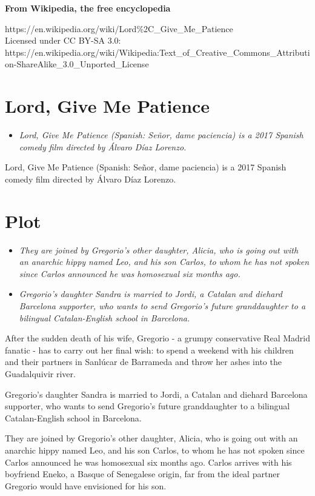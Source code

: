 \textbf{From Wikipedia, the free encyclopedia}

https://en.wikipedia.org/wiki/Lord\%2C\_Give\_Me\_Patience\\
Licensed under CC BY-SA 3.0:\\
https://en.wikipedia.org/wiki/Wikipedia:Text\_of\_Creative\_Commons\_Attribution-ShareAlike\_3.0\_Unported\_License

\section{Lord, Give Me Patience}\label{lord-give-me-patience}

\begin{itemize}
\item
  \emph{Lord, Give Me Patience (Spanish: Señor, dame paciencia) is a
  2017 Spanish comedy film directed by Álvaro Díaz Lorenzo.}
\end{itemize}

Lord, Give Me Patience (Spanish: Señor, dame paciencia) is a 2017
Spanish comedy film directed by Álvaro Díaz Lorenzo.

\section{Plot}\label{plot}

\begin{itemize}
\item
  \emph{They are joined by Gregorio's other daughter, Alicia, who is
  going out with an anarchic hippy named Leo, and his son Carlos, to
  whom he has not spoken since Carlos announced he was homosexual six
  months ago.}
\item
  \emph{Gregorio's daughter Sandra is married to Jordi, a Catalan and
  diehard Barcelona supporter, who wants to send Gregorio's future
  granddaughter to a bilingual Catalan-English school in Barcelona.}
\end{itemize}

After the sudden death of his wife, Gregorio - a grumpy conservative
Real Madrid fanatic - has to carry out her final wish: to spend a
weekend with his children and their partners in Sanlúcar de Barrameda
and throw her ashes into the Guadalquivir river.

Gregorio's daughter Sandra is married to Jordi, a Catalan and diehard
Barcelona supporter, who wants to send Gregorio's future granddaughter
to a bilingual Catalan-English school in Barcelona.

They are joined by Gregorio's other daughter, Alicia, who is going out
with an anarchic hippy named Leo, and his son Carlos, to whom he has not
spoken since Carlos announced he was homosexual six months ago. Carlos
arrives with his boyfriend Eneko, a Basque of Senegalese origin, far
from the ideal partner Gregorio would have envisioned for his son.

